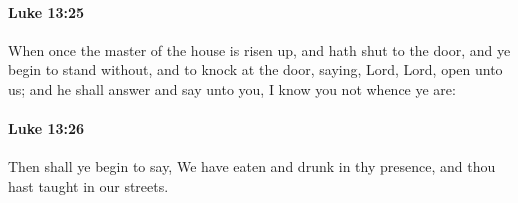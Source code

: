 		\paragraph{Luke 13:25} %
			\label{LUKE-13-25}

			When once the master of the house is risen up, and hath shut to the door, and ye begin to stand without, and to knock at the door, saying, Lord, Lord, open unto us; and he shall answer and say unto you, I know you not whence ye are:

			\begin{framed}
			\scriptsize
				\begin{compactdesc}
					\item[SBLG] 
				\end{compactdesc}
			\end{framed}

		\paragraph{Luke 13:26} %
			\label{LUKE-13-26}

			Then shall ye begin to say, We have eaten and drunk in thy presence, and thou hast taught in our streets.

